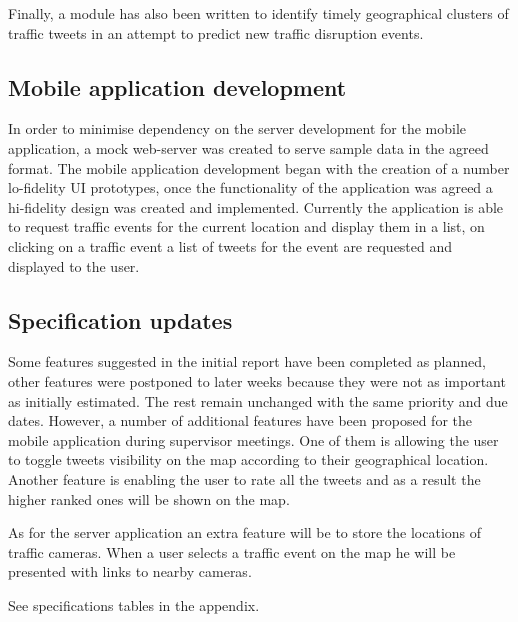 Finally, a module has also been written to identify timely geographical
clusters of traffic tweets in an attempt to predict new traffic disruption
events. 


\subsection{Mobile application development}

In order to minimise dependency on the server development for the mobile
application, a  mock web-server was created to serve sample data in the agreed
format. The mobile application development began with the creation of a number
lo-fidelity UI prototypes, once the functionality of the application was agreed
a hi-fidelity design was created and implemented. Currently the application is
able to request traffic events for the current location and display them in a
list, on clicking on a traffic event a list of tweets for the event are
requested and displayed to the user. 

\subsection{Specification updates}

Some features suggested in the initial report have been completed as planned, other features
were postponed to later weeks because they were not as important as initially estimated. 
The rest remain unchanged with the same priority and due dates. However, a number of additional features
have been proposed for the mobile application during supervisor meetings. One
of them is allowing the user to toggle tweets visibility on the map according
to their geographical location. Another feature is enabling the user to rate
all the tweets and as a result the higher ranked ones will be shown on the map.

As for the server application an extra feature will be to store the locations
of traffic cameras. When a user selects a traffic event on the map he will be
presented with links to nearby cameras.

See specifications tables in the appendix.

